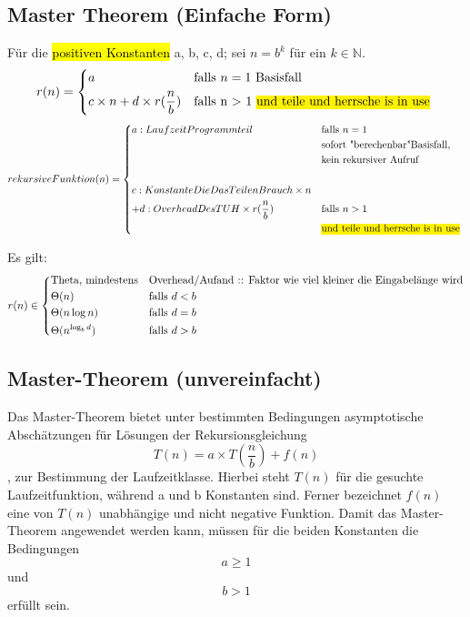 \documentclass[a4paper]{scrartcl}
\begin{document}
	\subsection{Master Theorem (Einfache Form)}
	Für die \hl{positiven Konstanten} a, b, c, d; sei \( n =b^k \) für ein \( k \in \mathbb{N} \).
	\begin{align*}
		r(n) =
		\begin{dcases*}
			a & falls \(n = 1\) Basisfall\\
			c \times n + d \times r (\frac{n}{b}) & falls n > 1 \hl{und teile und herrsche is in use}
		\end{dcases*}
	\end{align*}
	\begin{align*}
		rekursiveFunktion(n) =
			\begin{dcases*}
				a:LaufzeitProgrammteil & falls \(n = 1\)\\ 
				&sofort "berechenbar"Basisfall,\\
				&kein rekursiver Aufruf\\
				\\
				c:KonstanteDieDasTeilenBrauch \times n \\
				+ d:OverheadDesTUH  \times r (\frac{n}{b}) &falls  \(n > 1\)\\
				&\hl{und teile und herrsche is in use}
			\end{dcases*}
	\end{align*}
	
	Es gilt:
	\begin{align*}
	r(n) \in 
		\begin{dcases*}
			\text{Theta, mindestens} & Overhead/Aufand :: Faktor wie viel kleiner die Eingabelänge wird\\
			\Theta(n) & falls \(d < b\)\\
			\Theta(n \log n) & falls \(d = b\)\\
			\Theta(n^{\log_b d}) & falls \(d > b\)\\
		\end{dcases*}
	\end{align*}
	
	\subsection{Master-Theorem (unvereinfacht)}
	Das Master-Theorem bietet unter bestimmten Bedingungen asymptotische Abschätzungen für Lösungen der Rekursionsgleichung \[ T(n) = a \times T (\frac{n}{b}) + f(n) \], zur Bestimmung der Laufzeitklasse.
	Hierbei steht \(T(n)\) für die gesuchte Laufzeitfunktion, während a und b Konstanten sind. Ferner bezeichnet \( f(n) \) eine von \(T(n)\) unabhängige und nicht negative Funktion. Damit das Master-Theorem angewendet werden kann, müssen für die beiden Konstanten die Bedingungen \[a \geq 1 \] und \[ b > 1 \] erfüllt sein.\\
	\\
\end{document}
